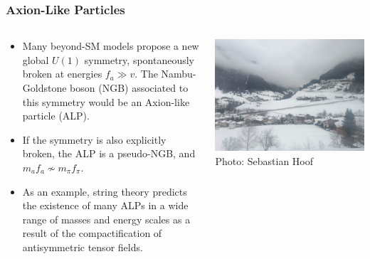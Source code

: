 \documentclass[mathserif, 10pt, aspectratio=169]{beamer}
\begin{document}
\begin{frame}\frametitle{Axion-Like Particles}
    \begin{columns}
        \begin{column}{0.75\textwidth}
            \begin{itemize}\setlength{\itemsep}{15pt}
                \item Many beyond-SM models propose a new global $U(1)$ symmetry, spontaneously broken at energies $f_a \gg v$. The Nambu-Goldstone boson (NGB) associated to this symmetry would be an Axion-like particle (ALP).
                \item If the symmetry is also explicitly broken, the ALP is a pseudo-NGB, and $m_a f_a \nsim m_\pi f_\pi$.
                \item As an example, string theory predicts the existence of many ALPs in a wide range of masses and energy scales as a result of the compactification of antisymmetric tensor fields.
            \end{itemize}
        \end{column}
        \begin{column}{0.25\textwidth}
            \includegraphics[width=\columnwidth]{figures/Alps.jpeg}\\
            {\scriptsize Photo: Sebastian Hoof}
        \end{column}
    \end{columns}
    
\end{frame}
\end{document}
